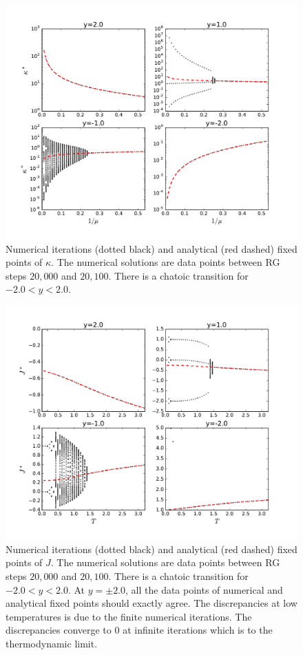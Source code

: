 \begin{figure}
\centering \includegraphics[width=1.0\columnwidth]{Chapter-3/HNP6_KvsMu_ys.pdf}
\protect\caption{Numerical iterations (dotted black) and analytical (red dashed) fixed points of $\kappa$. The numerical solutions are data points between RG steps $20,000$ and $20,100$. There is a chatoic transition for $-2.0<y<2.0$. }
\label{fig:afm-hp6Kys} 
\end{figure}

\begin{figure}
\centering \includegraphics[width=1.0\columnwidth]{Chapter-3/HNP6_JvsT_ys.pdf}
\protect\caption{Numerical iterations (dotted black) and analytical (red dashed) fixed points of $J$. The numerical solutions are data points between RG steps $20,000$ and $20,100$. There is a chatoic transition for $-2.0<y<2.0$. At $y=\pm 2.0$, all the data points of numerical and analytical fixed points should exactly agree. The discrepancies at low temperatures is due to the finite numerical iterations. The discrepancies converge to 0 at infinite iterations which is to the thermodynamic limit.}
\label{fig:afm-hp6Jys} 
\end{figure}

